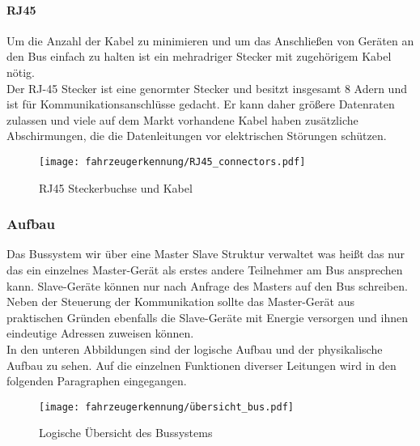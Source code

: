\paragraph{RJ45}\mbox{}

Um die Anzahl der Kabel zu minimieren und um das Anschließen von Geräten an den Bus einfach zu halten ist ein
mehradriger Stecker mit zugehörigem Kabel nötig.\\
Der RJ-45 Stecker ist eine genormter Stecker und besitzt insgesamt 8 Adern und ist für Kommunikationsanschlüsse gedacht. Er kann daher größere Datenraten zulassen und viele auf dem
Markt vorhandene Kabel haben zusätzliche Abschirmungen, die die Datenleitungen vor elektrischen Störungen schützen. 

\begin{figure}[H]
    \centering
    \texttt{[image: fahrzeugerkennung/RJ45\_connectors.pdf]}
    \caption{RJ45 Steckerbuchse und Kabel}
\end{figure}



\subsubsection{Aufbau}

Das Bussystem wir über eine Master Slave Struktur verwaltet was heißt das nur das ein einzelnes Master-Gerät als erstes andere Teilnehmer am Bus ansprechen kann.
Slave-Geräte können nur nach Anfrage des Masters auf den Bus schreiben. Neben der Steuerung der Kommunikation sollte das Master-Gerät aus praktischen Gründen ebenfalls die Slave-Geräte
mit Energie versorgen und ihnen eindeutige Adressen zuweisen können. \\

In den unteren Abbildungen sind der logische Aufbau und der physikalische Aufbau zu sehen.
Auf die einzelnen Funktionen diverser Leitungen wird in den folgenden Paragraphen eingegangen.

\begin{figure}[H]
    \centering
    \texttt{[image: fahrzeugerkennung/übersicht\_bus.pdf]}
    \caption{Logische Übersicht des Bussystems}
\end{figure}

